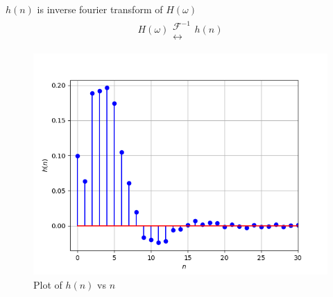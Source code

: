 \documentclass[journal,12pt,twocolumn]{IEEEtran}
\theoremstyle{remark}
\begin{document}
$h(n)$ is inverse fourier transform of $H(\omega)$
\begin{align}
    H(\omega) \mathrel{\substack{\mathcal{F}^{-1}\\\longleftrightarrow}} h(n)
\end{align}

\begin{figure}[htbp] 
\centering
\includegraphics[width=\columnwidth]{figs/h(n).png}
\caption{Plot of $h(n)$ vs $n$}
\end{figure}
\end{document}
